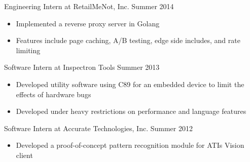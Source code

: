 \documentclass[line,margin]{res}
\begin{document}
\begin{resume}
                {\sc Engineering Intern at RetailMeNot, Inc.} \hfill Summer 2014
                 \begin{itemize}  \itemsep -2pt %
                 \item Implemented a reverse proxy server in Golang
                 \item Features include page caching, A/B testing, edge side includes, and rate limiting
                 \end{itemize}

                {\sc Software Intern at Inspectron Tools} \hfill Summer 2013
                 \begin{itemize}  \itemsep -2pt %
                 \item Developed utility software using C89 for an embedded device to limit the effects of hardware bugs
                 \item Developed under heavy restrictions on performance and language features
                 \end{itemize}

                {\sc Software Intern at Accurate Technologies, Inc.} \hfill            Summer 2012
                 \begin{itemize}  \itemsep -2pt %
                 \item Developed a proof-of-concept pattern recognition module for ATI\textquotesingle s Vision client
                 \end{itemize}


\end{resume}
\end{document}
